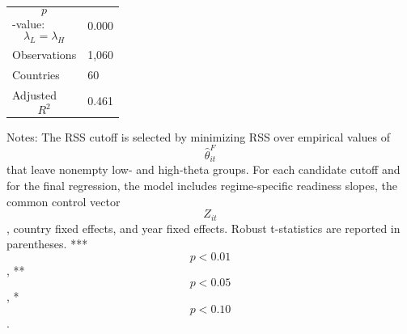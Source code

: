 \begin{table}[H]
\begin{threeparttable}
\begin{tabularx}{\textwidth}{lY}
$$p$$-value: $$\lambda_L=\lambda_H$$ & 0.000 \\
Observations & 1,060 \\
Countries & 60 \\
Adjusted $$R^2$$ & 0.461 \\
\bottomrule
\end{tabularx}
\begin{tablenotes}[flushleft]\footnotesize
\item Notes: The RSS cutoff is selected by minimizing RSS over empirical values of $$\widehat{\theta}^{F}_{it}$$ that leave nonempty low- and high-theta groups. For each candidate cutoff and for the final regression, the model includes regime-specific readiness slopes, the common control vector $$Z_{it}$$, country fixed effects, and year fixed effects. Robust t-statistics are reported in parentheses. *** $$p<0.01$$, ** $$p<0.05$$, * $$p<0.10$$.
\end{tablenotes}
\end{threeparttable}
\end{table}
